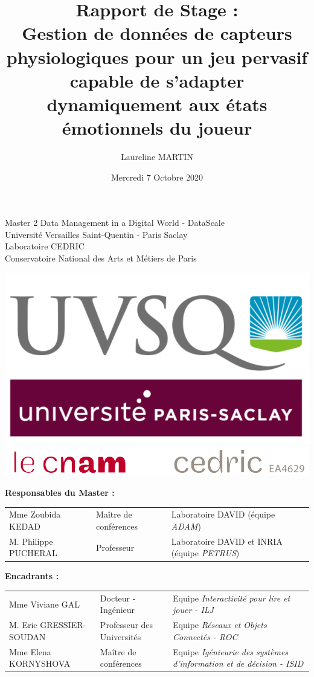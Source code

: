 \documentclass[11pt]{article}
\title{\textbf{Rapport de Stage :\\ Gestion de données de capteurs physiologiques pour un jeu pervasif capable de s'adapter dynamiquement aux états émotionnels du joueur}}
\author{Laureline MARTIN}
\date{Mercredi 7 Octobre 2020}
\begin{document}
\maketitle
\begin{center}
	\Large{Master 2 Data Management in a Digital World - DataScale\\ 
		Université Versailles Saint-Quentin - Paris Saclay\bigskip\\
		Laboratoire CEDRIC\\ 
		Conservatoire National des Arts et Métiers de Paris}
\end{center}
\vfill
\begin{center}
	\includegraphics[scale=0.25]{../include/uvsq.png}
	\includegraphics[scale=0.56]{../include/logo-cedric.PNG}\\
\end{center}
\vfill
\begin{center}
	\textbf{Responsables du Master :}
\end{center}
\begin{tabular}{p{4cm}p{4.5cm}p{7.5cm}}
	\hspace*{-1cm}
	Mme Zoubida KEDAD & Maître de conférences & Laboratoire DAVID (équipe \textit{ADAM})\\
	\hspace*{-1cm}
	M. Philippe PUCHERAL & Professeur & Laboratoire DAVID et INRIA (équipe \textit{PETRUS})
\end{tabular}\par
\begin{center}
	\textbf{Encadrants :}
\end{center}
\begin{tabular}{lp{4.5cm}p{7.5cm}}
	\hspace*{-1cm}
	Mme Viviane GAL & Docteur - Ingénieur & Equipe \textit{Interactivité pour lire et jouer - ILJ}\\
	\hspace*{-1cm}
	M. Eric GRESSIER-SOUDAN & Professeur des Universités & Equipe \textit{Réseaux et Objets Connectés - ROC}\\
	\hspace*{-1cm}
	Mme Elena KORNYSHOVA & Maître de conférences & Equipe \textit{Igénieurie des systèmes d'information et de décision - ISID}
\end{tabular}
\end{document}
